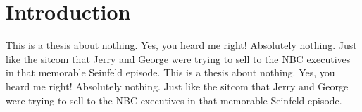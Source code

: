 \chapter{Introduction}
\label{chap:intro}

This is a thesis about nothing. Yes, you heard me right! Absolutely nothing. Just like the sitcom that Jerry and George were trying to sell to the NBC executives in that memorable Seinfeld episode.
This is a thesis about nothing. Yes, you heard me right! Absolutely nothing. Just like the sitcom that Jerry and George were trying to sell to the NBC executives in that memorable Seinfeld episode.